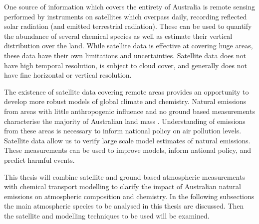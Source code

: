 One source of information which covers the entirety of Australia is remote sensing performed by instruments on satellites which overpass daily, recording reflected solar radiation (and emitted terrestrial radiation).
These can be used to quantify the abundance of several chemical species as well as estimate their vertical distribution over the land.
While satellite data is effective at covering huge areas, these data have their own limitations and uncertainties. Satellite data does not have high temporal resolution, is subject to cloud cover, and generally does not have fine horizontal or vertical resolution.

The existence of satellite data covering remote areas provides an opportunity to develop more robust models of global climate and chemistry.
Natural emissions from areas with little anthropogenic influence and no ground based measurements characterise the majority of Australian land mass \cite{VanDerA_2008}.
Understanding of emissions from these areas is necessary to inform national policy on air pollution levels.
Satellite data allow us to verify large scale model estimates of natural emissions.
These measurements can be used to improve models, inform national policy, and predict harmful events.

This thesis will combine satellite and ground based atmospheric measurements with chemical transport modelling to clarify the impact of Australian natural emissions on atmospheric composition and chemistry.
In the following subsections the main atmospheric species to be analysed in this thesis are discussed.
Then the satellite and modelling techniques to be used will be examined.
